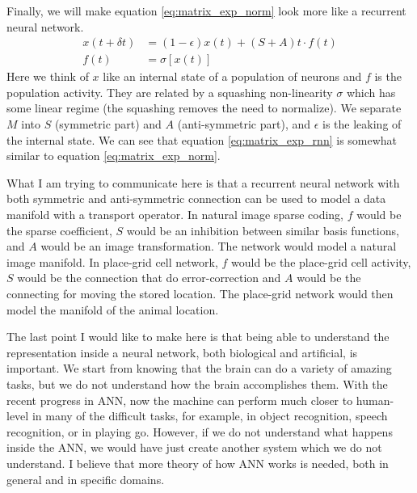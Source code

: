 Finally, we will make equation \ref{eq:matrix_exp_norm} look more like a recurrent neural network.
\begin{align}
\label{eq:matrix_exp_rnn}
x(t+\delta t) &= (1 - \epsilon) x(t) + (S + A)t \cdot f(t) \\
f(t) &= \sigma\left[x(t)\right]
\end{align}
Here we think of $x$ like an internal state of a population of neurons and $f$ is the population activity. They are related by a squashing non-linearity $\sigma$ which has some linear regime (the squashing removes the need to normalize). We separate $M$ into $S$ (symmetric part) and $A$ (anti-symmetric part), and $\epsilon$ is the leaking of the internal state. We can see that equation \ref{eq:matrix_exp_rnn} is somewhat similar to equation \ref{eq:matrix_exp_norm}.

What I am trying to communicate here is that a recurrent neural network with both symmetric and anti-symmetric connection can be used to model a data manifold with a transport operator. In natural image sparse coding, $f$ would be the sparse coefficient, $S$ would be an inhibition between similar basis functions, and $A$ would be an image transformation. The network would model a natural image manifold. In place-grid cell network, $f$ would be the place-grid cell activity, $S$ would be the connection that do error-correction and $A$ would be the connecting for moving the stored location. The place-grid network would then model the manifold of the animal location.

The last point I would like to make here is that being able to understand the representation inside a neural network, both biological and artificial, is important. We start from knowing that the brain can do a variety of amazing tasks, but we do not understand how the brain accomplishes them. With the recent progress in ANN, now the machine can perform much closer to human-level in many of the difficult tasks, for example, in object recognition, speech recognition, or in playing go. However, if we do not understand what happens inside the ANN, we would have just create another system which we do not understand. I believe that more theory of how ANN works is needed, both in general and in specific domains.

